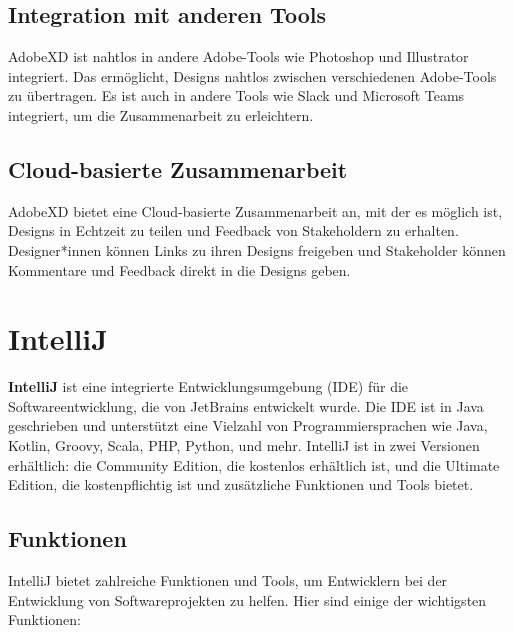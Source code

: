 \subsection*{Integration mit anderen Tools} 
AdobeXD ist nahtlos in andere Adobe-Tools wie Photoshop und Illustrator integriert. Das ermöglicht, Designs nahtlos zwischen verschiedenen Adobe-Tools zu übertragen. 
Es ist auch in andere Tools wie Slack und Microsoft Teams integriert, um die Zusammenarbeit zu erleichtern.

\subsection*{Cloud-basierte Zusammenarbeit} 
AdobeXD bietet eine Cloud-basierte Zusammenarbeit an, mit der es möglich ist, Designs in Echtzeit zu teilen und Feedback von Stakeholdern zu erhalten. 
Designer*innen können Links zu ihren Designs freigeben und Stakeholder können Kommentare und Feedback direkt in die Designs geben.

\section{IntelliJ}

\textbf{IntelliJ} ist eine integrierte Entwicklungsumgebung (IDE) für die Softwareentwicklung, die von JetBrains entwickelt wurde. Die IDE ist in Java geschrieben und unterstützt eine Vielzahl von Programmiersprachen wie Java, Kotlin, Groovy, Scala, PHP, Python, und mehr. IntelliJ ist in zwei Versionen erhältlich: die Community Edition, die kostenlos erhältlich ist, und die Ultimate Edition, die kostenpflichtig ist und zusätzliche Funktionen und Tools bietet.

\subsection{Funktionen}

IntelliJ bietet zahlreiche Funktionen und Tools, um Entwicklern bei der Entwicklung von Softwareprojekten zu helfen. Hier sind einige der wichtigsten Funktionen:

